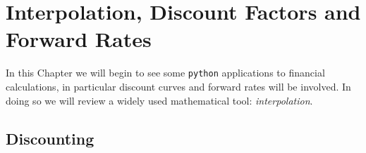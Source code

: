 \chapter{Interpolation, Discount Factors and Forward Rates}
\label{interpolation}

In this Chapter we will begin to see some \texttt{python} applications to financial calculations, in particular discount curves and forward rates will be involved. In doing so we will review a widely used mathematical tool: \emph{interpolation}.

\section{Discounting}
\label{discount-factors}

%
%
%
%
%
%
%
